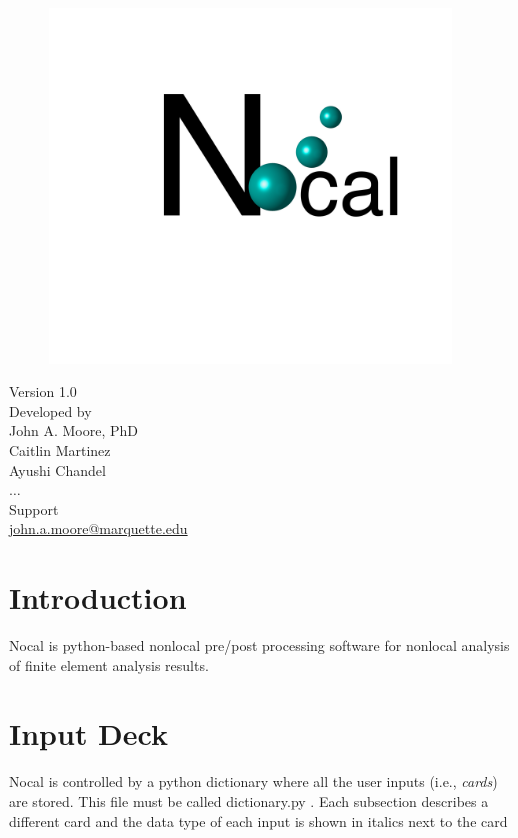 \documentclass[11pt]{article}
\newcommand{\inputDeckName}{dictionary.py }
\begin{document}
 
\begin{figure}[ht!]
\centering
\includegraphics[trim={10cm 10cm 4cm 0cm},clip,  width=0.95\textwidth]{nocal.png}
\end{figure}
{\centering  Version 1.0 \\
Developed by \\
John A. Moore, PhD \\
Caitlin Martinez \\
Ayushi Chandel  \\
$\hdots$ \\
Support\\
\url{john.a.moore@marquette.edu}\\
}
\section{Introduction}
Nocal is python-based nonlocal pre/post processing software for nonlocal analysis of finite element analysis results. 
\section{Input Deck}
Nocal is controlled by a python dictionary where all the user inputs (i.e., \emph{cards}) are stored. This file must be called \inputDeckName. Each subsection describes a different card and the data type of each input is shown in italics next to the card
\end{document}
